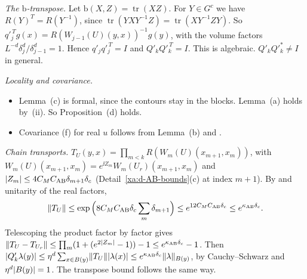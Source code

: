 \begin{detail}\label{xa:d-AB-iv}
\emph{The $\mathrm b$-transpose.} Let $\mathrm b(X,Z)=\operatorname{tr}(XZ)$. For $Y\in G^c$ we have $R(Y)^T=R(Y^{-1})$, since $\operatorname{tr}(YXY^{-1}Z)=\operatorname{tr}(XY^{-1}ZY)$. So $q'^{\,T}_jg(x)=R(W_{j-1}(U)(y,x))^{-1}g(y)$, with the volume factors $L^{-d}\delta_j^d/\delta_{j-1}^d=1$. Hence $q'_jq'^{\,T}_j=I$ and $Q'_kQ'^{\,T}_k=I$. This is algebraic. $Q'_kQ'^*_k\ne I$ in general.

\emph{Locality and covariance.}
\begin{itemize}
\item Lemma~(c) is formal, since the contours stay in the blocks. Lemma~(a) holds by~(ii). So Proposition~(d) holds.
\item Covariance (f) for real $u$ follows from Lemma~(b) and .
\end{itemize}

\emph{Chain transports.} $T_U(y,x)=\prod_{m<k}R(W_m(U)(x_{m+1},x_m))$, with $W_m(U)(x_{m+1},x_m)=e^{\ii Z_m}W_m(U_r)(x_{m+1},x_m)$ and $\lvert Z_m\rvert\le4C_MC_{\rm AB}\delta_{m+1}\delta_c$ (Detail~\ref{xa:d-AB-bounds}(c) at index $m+1$). By  and unitarity of the real factors,
\[
\lVert T_U\rVert\le\exp\Big(8C_MC_{\rm AB}\delta_c\sum_m\delta_{m+1}\Big)\le e^{12C_MC_{\rm AB}\delta_c}\le e^{\kappa_{\rm AB}\delta_c}.
\]
Telescoping the product factor by factor gives $\lVert T_U-T_{U_r}\rVert\le\prod_m(1+(e^{2\lvert Z_m\rvert}-1))-1\le e^{\kappa_{\rm AB}\delta_c}-1$. Then $\lvert Q'_k\lambda(y)\rvert\le\eta^d\sum_{x\in B(y)}\lVert T_U\rVert\lvert\lambda(x)\rvert\le e^{\kappa_{\rm AB}\delta_c}\lVert\lambda\rVert_{B(y)}$, by Cauchy--Schwarz and $\eta^d\lvert B(y)\rvert=1$. The transpose bound follows the same way.


\end{detail}
